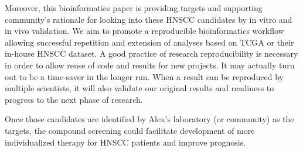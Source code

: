\documentclass[preprint,12pt]{elsarticle}
\newenvironment{MyColorPar}[1]{%
    \leavevmode\color{#1}\ignorespaces%
}{%
}%
\begin{document}
\begin{MyColorPar}{blue}
Moreover, this bioinformatics paper is providing targets and supporting community's rationale for looking into these HNSCC candidates by in vitro and in vivo validation. %
We aim to promote a reproducible bioinformatics\cite{Preeyanon2014}\cite{Kulkarni2018} workflow allowing successful repetition and extension of analyses based on TCGA or their in-house HNSCC dataset. %
A good practice of research reproducibility is necessary in order to allow %
reuse of code and results for new projects. %
It may actually turn out to be a time-saver in the longer run.
When a result can be reproduced by multiple scientists, it will also validate our original results and readiness to progress to the next phase of research. 

Once those candidates are identified by Alex's laboratory (or community) as the targets, the compound screening could facilitate development of more individualized therapy for HNSCC patients and improve prognosis. %





\end{MyColorPar}
\end{document}
